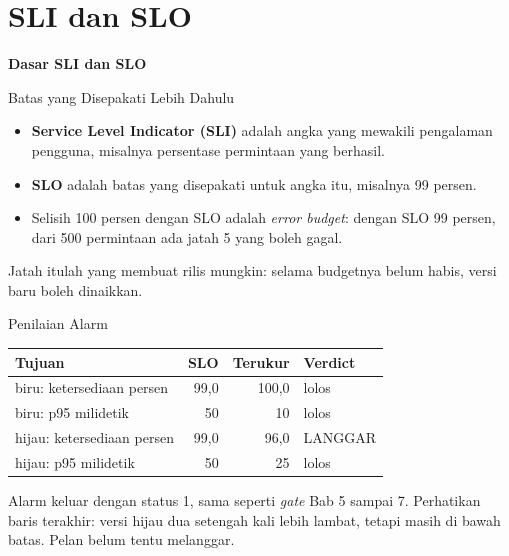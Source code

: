 \documentclass[aspectratio=169, table, 12pt]{beamer}
\begin{document}
\section{SLI dan SLO}

\begin{frame}{\hfill}
  \centering
  \Huge{\textbf{Dasar SLI dan SLO}}
\end{frame}

\begin{frame}{{\Large Batas yang Disepakati Lebih Dahulu}}
  \vspace{12pt}
  \begin{itemize}
    \item \textbf{Service Level Indicator (SLI)} adalah angka yang mewakili pengalaman pengguna,
          misalnya persentase permintaan yang berhasil.
    \item \textbf{SLO} adalah batas yang disepakati untuk angka itu,
          misalnya 99 persen.
    \item Selisih 100 persen dengan SLO adalah \textit{error budget}: dengan
          SLO 99 persen, dari 500 permintaan ada jatah 5 yang boleh gagal.
  \end{itemize}
  \vspace{8pt}
  {\small Jatah itulah yang membuat rilis mungkin: selama budgetnya belum
  habis, versi baru boleh dinaikkan.}
\end{frame}

\begin{frame}{{\Large Penilaian Alarm}}
  \vspace{6pt}
  \centering
  {\footnotesize
  \begin{tabularx}{\textwidth}{Yrrl}
    \hline
    \textbf{Tujuan} & \textbf{SLO} & \textbf{Terukur} & \textbf{Verdict} \\
    \hline
    biru: ketersediaan persen & 99,0 & 100,0 & lolos \\
    \hline
    biru: p95 milidetik & 50 & 10 & lolos \\
    \hline
    hijau: ketersediaan persen & 99,0 & 96,0 & LANGGAR \\
    \hline
    hijau: p95 milidetik & 50 & 25 & lolos \\
    \hline
  \end{tabularx}}

  \vspace{6pt}
  {\footnotesize Alarm keluar dengan status 1, sama seperti \textit{gate} Bab 5
  sampai 7. Perhatikan baris terakhir: versi hijau dua setengah kali lebih
  lambat, tetapi masih di bawah batas. Pelan belum tentu melanggar.}
\end{frame}
\end{document}
